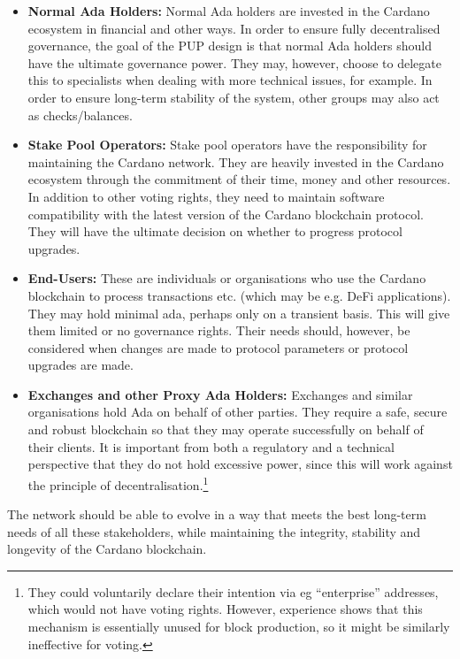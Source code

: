 \begin{itemize}
\item
  \textbf{Normal Ada Holders:}
  Normal Ada holders are invested in the Cardano ecosystem in financial and other ways.
   In order to ensure fully decentralised governance, the goal of the PUP design is that normal Ada holders should have the ultimate governance power. They may, however, choose to delegate this to specialists when dealing with more technical issues, for example.   In order to ensure long-term stability of the system, other groups may also act as checks/balances.
  \item
  \textbf{Stake Pool Operators:}
  Stake pool operators have the responsibility for maintaining the Cardano network.  They are heavily invested in the Cardano ecosystem through the commitment of their time, money and other resources.
  In addition to other voting rights, they need to maintain software compatibility with the latest version of the Cardano blockchain protocol.
  They will have the ultimate decision on whether to progress protocol upgrades.
  \item
  \textbf{End-Users:}
  These are individuals or organisations who use the Cardano blockchain to process transactions etc. (which may be e.g. DeFi applications).
  They may hold minimal ada, perhaps only on a transient basis.
  This will give them limited or no governance rights.  Their needs should, however, be considered when changes are made to protocol parameters or
  protocol upgrades are made.
  \item
  \textbf{Exchanges and other Proxy Ada Holders:}
  Exchanges and similar organisations hold Ada on behalf of other parties.  They require a safe, secure and robust blockchain so that they may operate successfully on
  behalf of their clients.  It is important from both a regulatory and a technical perspective that they do not hold excessive
  power, since this will work against the principle of decentralisation.\footnote{They could voluntarily declare their intention via eg ``enterprise'' addresses, which would not have voting rights. However, experience shows that this mechanism is essentially unused for block production, so it might be similarly ineffective for voting.}
\end{itemize}

The network should be able to evolve in a way that meets the best long-term needs of all these stakeholders, while maintaining the integrity, stability and longevity of
the Cardano blockchain.
